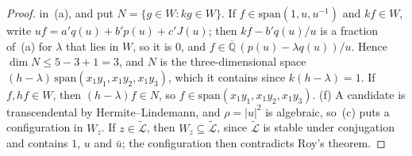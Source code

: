 \documentclass[11pt,a4paper]{article}
\theoremstyle{plain}
\theoremstyle{definition}
\newcommand{\Alg}{\overline{\mathbb{Q}}}
\newcommand{\aLogs}{\widetilde{\mathcal{L}}}
\begin{document}
\begin{proof}
in~(a), and put $N=\{g\in W:kg\in W\}$. If $f\in\mathrm{span}(1,u,u^{-1})$ and $kf\in W$, write
$uf=a'q(u)+b'p(u)+c'J(u)$; then $kf-b'q(u)/u$ is a fraction of~(a) for $\lambda$ that lies in $W$, so it is $0$, and
$f\in\Alg\,(p(u)-\lambda q(u))/u$. Hence $\dim N\le5-3+1=3$, and $N$ is the three-dimensional space
$(h-\lambda)\,\mathrm{span}(x_{1}y_{1},x_{1}y_{2},x_{1}y_{3})$, which it contains since $k(h-\lambda)=1$. If $f,hf\in W$,
then $(h-\lambda)f\in N$, so $f\in\mathrm{span}(x_{1}y_{1},x_{1}y_{2},x_{1}y_{3})$.
(f) A candidate is transcendental by Hermite--Lindemann, and $\rho=|u|^{2}$ is algebraic, so~(c) puts a configuration
in $W_{z}$. If $z\in\aLogs$, then $W_{z}\subseteq\aLogs$, since $\aLogs$ is stable under conjugation and contains $1$,
$u$ and $\bar u$; the configuration then contradicts Roy's theorem.
\end{proof}
\end{document}

